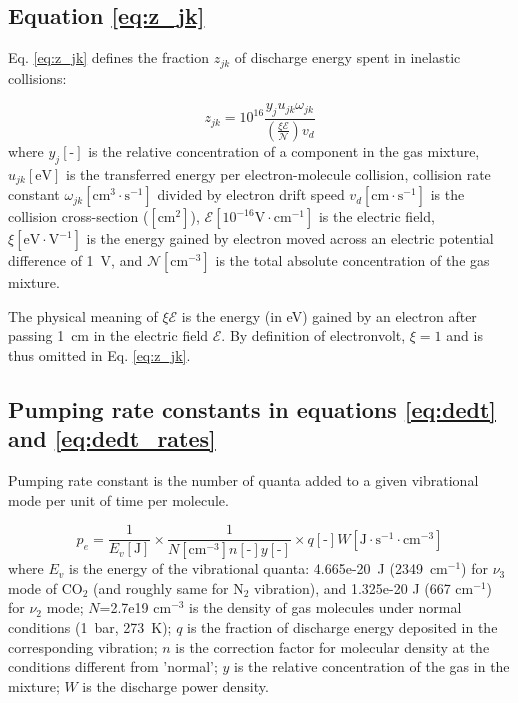 \documentclass{report}
\begin{document}
\begin{appendices}
\subsection*{Equation \ref{eq:z_jk}}

Eq. \ref{eq:z_jk} defines the fraction $z_{jk}$ of discharge energy spent in inelastic collisions:

\begin{equation*}
z_{jk} = 10^{16} \frac{y_j u_{jk} \omega _{jk}} {\left( \frac{\xi\mathcal{E}}{\mathcal{N}} \right) v_d}  
\end{equation*}
where $y_j[\text{-}]$ is the relative concentration of a component in the gas mixture, $u_{jk}[\text{eV}]$ is the transferred energy per electron-molecule collision, collision rate constant $\omega _{jk}[\text{cm}^3\cdot\text{s}^{-1}]$ divided by electron drift speed $v_d[\text{cm}\cdot\text{s}^{-1}]$ is the collision cross-section ($[\text{cm}^2]$), $\mathcal{E}[10^{-16}\text{V}\cdot\text{cm}^{-1}]$ is the electric field, $\xi[\text{eV}\cdot\text{V}^{-1}]$ is the energy gained by electron moved across an electric potential difference of 1~V,  and $\mathcal{N}[\text{cm}^{-3}]$ is the total absolute concentration of the gas mixture.

The physical meaning of $\xi\mathcal{E}$ is the energy (in eV) gained by an electron after passing 1~cm in the electric field $\mathcal{E}$. By definition of electronvolt, $\xi = 1$ and is thus omitted in Eq. \ref{eq:z_jk}.



\subsection*{Pumping rate constants in equations \ref{eq:dedt} and \ref{eq:dedt_rates}}

Pumping rate constant is the number of quanta added to a given vibrational mode per unit of time per molecule.

\begin{equation*}
p_e = \frac{1}{E_v[\text{J}]} \times \frac{1}{N[\text{cm}^{-3}] n[\text{-}] y[\text{-}]} \times q[\text{-}] W[\text{J}\cdot \text{s}^{-1} \cdot \text{cm}^{-3}]
\end{equation*}
where $E_v$ is the energy of the vibrational quanta: 4.665e-20~J (2349~{cm$^{-1}$}) for $\nu_3$ mode of {CO$_2$} (and roughly same for {N$_2$} vibration), and  1.325e-20 J (667 {cm$^{-1}$}) for $\nu_2$ mode; $N$=2.7e19 {cm$^{-3}$} is the density of gas molecules under normal conditions (1~bar, 273~K); $q$ is the fraction of discharge energy deposited in the corresponding vibration; $n$ is the correction factor for molecular density at the conditions different from 'normal'; $y$ is the relative concentration of the gas in the mixture; $W$ is the discharge power density.


\end{appendices}
\end{document}
